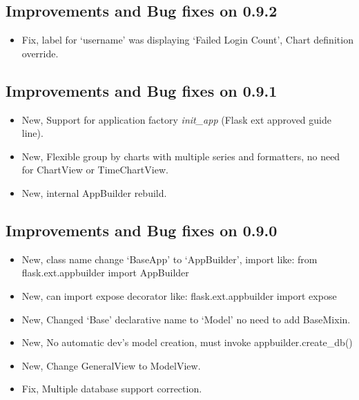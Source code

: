 \documentclass[letterpaper,10pt,english]{sphinxmanual}
\begin{document}
\subsection{Improvements and Bug fixes on 0.9.2}
\label{versions:improvements-and-bug-fixes-on-0-9-2}\begin{itemize}
\item {} 
Fix, label for `username' was displaying `Failed Login Count', Chart definition override.

\end{itemize}


\subsection{Improvements and Bug fixes on 0.9.1}
\label{versions:improvements-and-bug-fixes-on-0-9-1}\begin{itemize}
\item {} 
New, Support for application factory \emph{init\_app} (Flask ext approved guide line).

\item {} 
New, Flexible group by charts with multiple series and formatters, no need for ChartView or TimeChartView.

\item {} 
New, internal AppBuilder rebuild.

\end{itemize}


\subsection{Improvements and Bug fixes on 0.9.0}
\label{versions:improvements-and-bug-fixes-on-0-9-0}\begin{itemize}
\item {} 
New, class name change `BaseApp' to `AppBuilder', import like: from flask.ext.appbuilder import AppBuilder

\item {} 
New, can import expose decorator like: flask.ext.appbuilder import expose

\item {} 
New, Changed `Base' declarative name to `Model' no need to add BaseMixin.

\item {} 
New, No automatic dev's model creation, must invoke appbuilder.create\_db()

\item {} 
New, Change GeneralView to ModelView.

\item {} 
Fix, Multiple database support correction.

\end{itemize}
\end{document}
